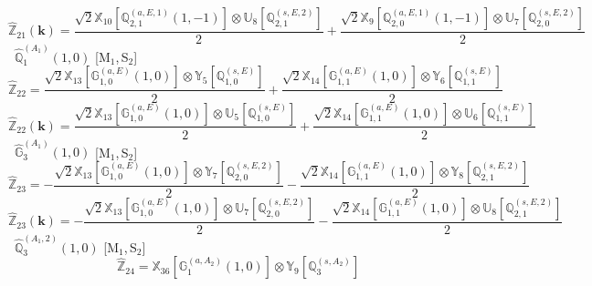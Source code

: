 \documentclass[fleqn,10pt,landscape]{article}
\begin{document}
\begin{itemize}
\begin{dmath*}
\end{dmath*}
\begin{dmath*}
\hat{\mathbb{Z}}_{21}(\bm{k})=\frac{\sqrt{2} \mathbb{X}_{10}[\mathbb{Q}_{2,1}^{(a,E,1)}(1,-1)] \otimes\mathbb{U}_{8}[\mathbb{Q}_{2,1}^{(s,E,2)}]}{2} + \frac{\sqrt{2} \mathbb{X}_{9}[\mathbb{Q}_{2,0}^{(a,E,1)}(1,-1)] \otimes\mathbb{U}_{7}[\mathbb{Q}_{2,0}^{(s,E,2)}]}{2}
\end{dmath*}
\vspace{4mm}
\noindent {} $\,\,\,\hat{\mathbb{Q}}_{1}^{(A_{1})}(1,0)$ [M$_{1}$,\,S$_{2}$]
\begin{dmath*}
\hat{\mathbb{Z}}_{22}=\frac{\sqrt{2} \mathbb{X}_{13}[\mathbb{G}_{1,0}^{(a,E)}(1,0)] \otimes\mathbb{Y}_{5}[\mathbb{Q}_{1,0}^{(s,E)}]}{2} + \frac{\sqrt{2} \mathbb{X}_{14}[\mathbb{G}_{1,1}^{(a,E)}(1,0)] \otimes\mathbb{Y}_{6}[\mathbb{Q}_{1,1}^{(s,E)}]}{2}
\end{dmath*}
\begin{dmath*}
\hat{\mathbb{Z}}_{22}(\bm{k})=\frac{\sqrt{2} \mathbb{X}_{13}[\mathbb{G}_{1,0}^{(a,E)}(1,0)] \otimes\mathbb{U}_{5}[\mathbb{Q}_{1,0}^{(s,E)}]}{2} + \frac{\sqrt{2} \mathbb{X}_{14}[\mathbb{G}_{1,1}^{(a,E)}(1,0)] \otimes\mathbb{U}_{6}[\mathbb{Q}_{1,1}^{(s,E)}]}{2}
\end{dmath*}
\vspace{4mm}
\noindent {} $\,\,\,\hat{\mathbb{G}}_{3}^{(A_{1})}(1,0)$ [M$_{1}$,\,S$_{2}$]
\begin{dmath*}
\hat{\mathbb{Z}}_{23}=- \frac{\sqrt{2} \mathbb{X}_{13}[\mathbb{G}_{1,0}^{(a,E)}(1,0)] \otimes\mathbb{Y}_{7}[\mathbb{Q}_{2,0}^{(s,E,2)}]}{2} - \frac{\sqrt{2} \mathbb{X}_{14}[\mathbb{G}_{1,1}^{(a,E)}(1,0)] \otimes\mathbb{Y}_{8}[\mathbb{Q}_{2,1}^{(s,E,2)}]}{2}
\end{dmath*}
\begin{dmath*}
\hat{\mathbb{Z}}_{23}(\bm{k})=- \frac{\sqrt{2} \mathbb{X}_{13}[\mathbb{G}_{1,0}^{(a,E)}(1,0)] \otimes\mathbb{U}_{7}[\mathbb{Q}_{2,0}^{(s,E,2)}]}{2} - \frac{\sqrt{2} \mathbb{X}_{14}[\mathbb{G}_{1,1}^{(a,E)}(1,0)] \otimes\mathbb{U}_{8}[\mathbb{Q}_{2,1}^{(s,E,2)}]}{2}
\end{dmath*}
\vspace{4mm}
\noindent {} $\,\,\,\hat{\mathbb{Q}}_{3}^{(A_{1},2)}(1,0)$ [M$_{1}$,\,S$_{2}$]
\begin{dmath*}
\hat{\mathbb{Z}}_{24}=\mathbb{X}_{36}[\mathbb{G}_{1}^{(a,A_{2})}(1,0)] \otimes\mathbb{Y}_{9}[\mathbb{Q}_{3}^{(s,A_{2})}]
\end{dmath*}
\begin{dmath*}

\end{dmath*}
\end{itemize}
\end{document}
